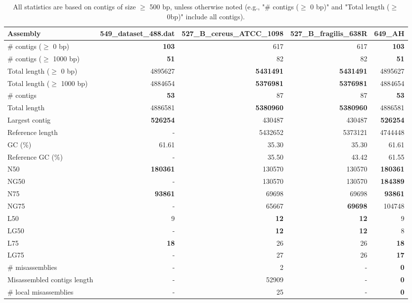 \documentclass[12pt,a4paper]{article}
\begin{document}
\begin{table}[ht]
\begin{center}
\caption{All statistics are based on contigs of size $\geq$ 500 bp, unless otherwise noted (e.g., "\# contigs ($\geq$ 0 bp)" and "Total length ($\geq$ 0bp)" include all contigs).}
\begin{tabular}{|l*{4}{|r}|}
\hline
Assembly & 549\_dataset\_488.dat & 527\_B\_cereus\_ATCC\_1098 & 527\_B\_fragilis\_638R & 649\_AH \\ \hline
\# contigs ($\geq$ 0 bp) & {\bf 103} & 617 & 617 & {\bf 103} \\ \hline
\# contigs ($\geq$ 1000 bp) & {\bf 51} & 82 & 82 & {\bf 51} \\ \hline
Total length ($\geq$ 0 bp) & 4895627 & {\bf 5431491} & {\bf 5431491} & 4895627 \\ \hline
Total length ($\geq$ 1000 bp) & 4884654 & {\bf 5376981} & {\bf 5376981} & 4884654 \\ \hline
\# contigs & {\bf 53} & 87 & 87 & {\bf 53} \\ \hline
Total length & 4886581 & {\bf 5380960} & {\bf 5380960} & 4886581 \\ \hline
Largest contig & {\bf 526254} & 430487 & 430487 & {\bf 526254} \\ \hline
Reference length & - & 5432652 & 5373121 & 4744448 \\ \hline
GC (\%) & 61.61 & 35.30 & 35.30 & 61.61 \\ \hline
Reference GC (\%) & - & 35.50 & 43.42 & 61.55 \\ \hline
N50 & {\bf 180361} & 130570 & 130570 & {\bf 180361} \\ \hline
NG50 & - & 130570 & 130570 & {\bf 184389} \\ \hline
N75 & {\bf 93861} & 69698 & 69698 & {\bf 93861} \\ \hline
NG75 & - & 65667 & {\bf 69698} & 104748 \\ \hline
L50 & 9 & {\bf 12} & {\bf 12} & 9 \\ \hline
LG50 & - & {\bf 12} & {\bf 12} & 8 \\ \hline
L75 & {\bf 18} & 26 & 26 & {\bf 18} \\ \hline
LG75 & - & 27 & 26 & {\bf 17} \\ \hline
\# misassemblies & - & 2 & - & {\bf 0} \\ \hline
Misassembled contigs length & - & 52909 & - & {\bf 0} \\ \hline
\# local misassemblies & - & 25 & - & {\bf 0} \\ \hline

\end{tabular}
\end{center}
\end{table}
\end{document}
